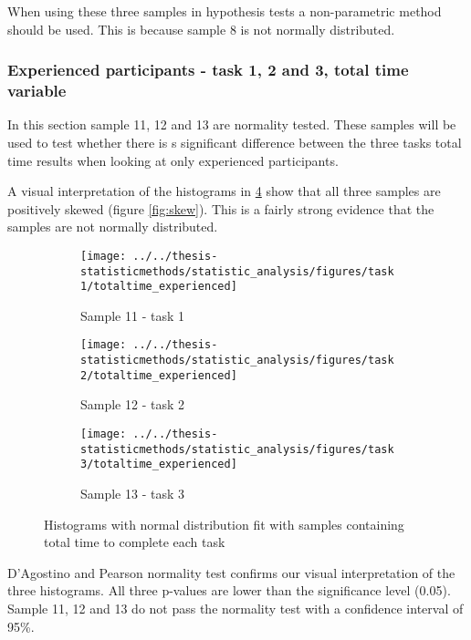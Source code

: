 \vspace{0.4cm}

When using these three samples in hypothesis tests a non-parametric method should be used. This is because sample 8 is not normally distributed. 

\subsubsection[Sample 11, 12 and 13]{Experienced participants - task 1, 2 and 3, total time variable}
In this section sample 11, 12 and 13 are normality tested. These samples will be used to test whether there is s significant difference between the three tasks total time results when looking at only experienced participants. 

A visual interpretation of the histograms in \ref{fig:sample11_12_13_histogram} show that all three samples are positively skewed (figure \ref{fig:skew}). This is a fairly strong evidence that the samples are not normally distributed.

 \begin{figure}[H]
 	\centering
	 \begin{subfigure}[b]{0.32\textwidth}
	 	\centering
	 	\texttt{[image: ../../thesis-statisticmethods/statistic\_analysis/figures/task1/totaltime\_experienced]}
	 	\caption{Sample 11 - task 1}
	 	\label{fig:totaltimeexperienced_task1}
	 \end{subfigure}
	 \begin{subfigure}[b]{0.32\textwidth}
	 	\centering
	 	\texttt{[image: ../../thesis-statisticmethods/statistic\_analysis/figures/task2/totaltime\_experienced]}
	 	\caption{Sample 12 - task 2}
	 	\label{fig:totaltimeexperienced_task2}
	 \end{subfigure}
	 \begin{subfigure}[b]{0.32\textwidth}
	 	\centering
	 	\texttt{[image: ../../thesis-statisticmethods/statistic\_analysis/figures/task3/totaltime\_experienced]}
	 	\caption{Sample 13 - task 3}
	 	\label{fig:totaltimeexperienced}
	 \end{subfigure}
 	\caption{Histograms with normal distribution fit with samples containing total time to complete each task}
 	\label{fig:sample11_12_13_histogram}
 \end{figure}
 
D'Agostino and Pearson normality test confirms our visual interpretation of the three histograms. All three p-values are lower than the significance level (0.05). Sample 11, 12 and 13 do not pass the normality test with a confidence interval of 95\%. \\[0.2cm]
 
